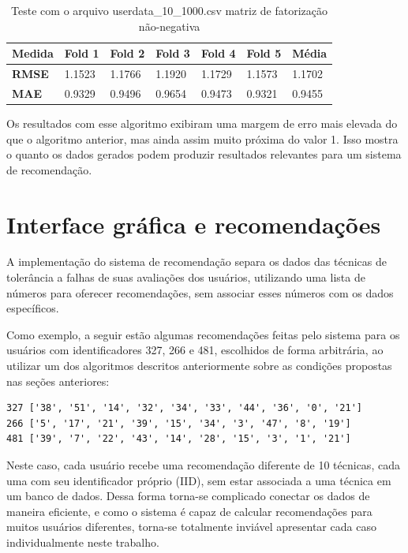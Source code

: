 \documentclass[
	12pt,				%
	oneside,			%
	a4paper,			%
	chapter=TITLE,		%
	english,			%
	french,				%
	spanish,			%
	brazil				%
	]{abntex2}
\begin{document}
\begin{table}[ht]
    \centering
    \ABNTEXchapterfont
    \caption{Teste com o arquivo userdata\_10\_1000.csv matriz de fatorização não-negativa}
    \begin{tabular}{|m{1.5cm}|m{1.5cm}|m{1.5cm}|m{1.5cm}|m{1.5cm}|m{1.5cm}|m{1.5cm}|}
    \hline
        \textbf{Medida}& \textbf{Fold 1} & \textbf{Fold 2} & \textbf{Fold 3} & \textbf{Fold 4}& \textbf{Fold 5} & \textbf{Média}\\
        \hline
        \hline
        \textbf{RMSE} & 1.1523 & 1.1766 & 1.1920 & 1.1729 & 1.1573 & 1.1702\\ 
        \hline
        \textbf{MAE} & 0.9329 & 0.9496 & 0.9654 & 0.9473 & 0.9321 & 0.9455 \\
        \hline
    \end{tabular}
    \label{tab:teste12}
\end{table}

Os resultados com esse algoritmo exibiram uma margem de erro mais elevada do que o algoritmo anterior, mas ainda assim muito próxima do valor 1. Isso mostra o quanto os dados gerados podem produzir resultados relevantes para um sistema de recomendação.

\section{Interface gráfica e recomendações} \label{sec_interface}

A implementação do sistema de recomendação separa os dados das técnicas de tolerância a falhas de suas avaliações dos usuários, utilizando uma lista de números para oferecer recomendações, sem associar esses números com os dados específicos.

Como exemplo, a seguir estão algumas recomendações feitas pelo sistema para os usuários com identificadores 327, 266 e 481, escolhidos de forma arbitrária, ao utilizar um dos algoritmos descritos anteriormente sobre as condições propostas nas seções anteriores:

\begin{verbatim}
327 ['38', '51', '14', '32', '34', '33', '44', '36', '0', '21']
266 ['5', '17', '21', '39', '15', '34', '3', '47', '8', '19']
481 ['39', '7', '22', '43', '14', '28', '15', '3', '1', '21']
\end{verbatim}

Neste caso, cada usuário recebe uma recomendação diferente de 10 técnicas, cada uma com seu identificador próprio (IID), sem estar associada a uma técnica em um banco de dados. Dessa forma torna-se complicado conectar os dados de maneira eficiente, e como o sistema é capaz de calcular recomendações para muitos usuários diferentes, torna-se totalmente inviável apresentar cada caso individualmente neste trabalho.
\end{document}
